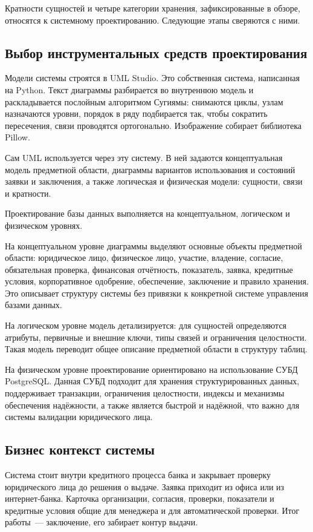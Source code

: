 Кратности сущностей и четыре категории хранения, зафиксированные в обзоре, относятся к системному проектированию. Следующие этапы сверяются с ними.

\subsection{Выбор инструментальных средств проектирования}

Модели системы строятся в UML Studio. Это собственная система, написанная на Python. Текст диаграммы разбирается во внутреннюю модель и раскладывается послойным алгоритмом Сугиямы: снимаются циклы, узлам назначаются уровни, порядок в ряду подбирается так, чтобы сократить пересечения, связи проводятся ортогонально. Изображение собирает библиотека Pillow.

Сам UML используется через эту систему. В ней задаются концептуальная модель предметной области, диаграммы вариантов использования и состояний заявки и заключения, а также логическая и физическая модели: сущности, связи и кратности.

Проектирование базы данных выполняется на концептуальном, логическом и физическом уровнях.

На концептуальном уровне диаграммы выделяют основные объекты предметной области: юридическое лицо, физическое лицо, участие, владение, согласие, обязательная проверка, финансовая отчётность, показатель, заявка, кредитные условия, корпоративное одобрение, обеспечение, заключение и правило хранения. Это описывает структуру системы без привязки к конкретной системе управления базами данных.

На логическом уровне модель детализируется: для сущностей определяются атрибуты, первичные и внешние ключи, типы связей и ограничения целостности. Такая модель переводит общее описание предметной области в структуру таблиц.

На физическом уровне проектирование ориентировано на использование СУБД PostgreSQL. Данная СУБД подходит для хранения структурированных данных, поддерживает транзакции, ограничения целостности, индексы и механизмы обеспечения надёжности, а также является быстрой и надёжной, что важно для системы валидации юридического лица.

\ifdefined\skipbizcontext\else
\subsection{Бизнес контекст системы}

Система стоит внутри кредитного процесса банка и закрывает проверку юридического лица до решения о выдаче. Заявка приходит из офиса или из интернет-банка. Карточка организации, согласия, проверки, показатели и кредитные условия общие для менеджера и для автоматической проверки. Итог работы~--- заключение, его забирает контур выдачи.

